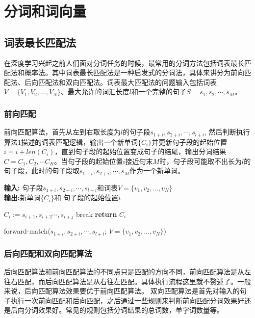 \documentclass[twoside,a4paper,12pt]{book}%
\begin{document}
\chapter{分词和词向量}

\section{词表最长匹配法}
在深度学习兴起之前人们面对分词任务的时候，最常用的分词方法包括词表最长匹配法和概率法。其中词表最长匹配法是一种启发式的分词法，具体来讲分为前向匹配法、后向匹配法和双向匹配法。词表最大匹配法的问题输入包括词表$V=\{V_1,V_2,\dots,V_N\}$、最大允许的词汇长度$l$和一个完整的句子$S=s_1,s_2,\cdots,s_M$。
\subsection{前向匹配}
前向匹配算法，首先从左到右取长度为$l$的句子段$s_{1+i},s_{2+i},\cdots,s_{l+i}$, 然后判断执行算法1描述的词表匹配逻辑，输出一个新单词$\{C_i\}$并更新句子段的起始位置$i=i + len(C_i)$，直到句子段的起始位置变成句子的结尾，输出分词结果$C=C_1,C_2, \cdots C_K$。当句子段的起始位置$i$接近句末$M$时，句子段可能取不出长为$l$的句子段，此时的句子段取$s_{1+i},s_{2+i},\cdots,s_{M}$作为一个新单词。
\begin{algorithm}[h]
    \textbf{输入:} 句子段$s_{1+i},s_{2+i},\cdots,s_{l+i}$和词表$V=\{v_1,v_2,\dots,v_N\}$\\
    \textbf{输出:}新单词$\{C_i\}$和 句子段的起始位置$i$
    \begin{algorithmic}[1]
     \label{algline:end} 
         \STATE $C_i:=s_{i+1},s_{i+2}\cdots,s_{i+j}$
         \STATE break \label{algline:break}
        \ENDIF  
    \ENDFOR \label{algline:endfor}
    \STATE \textbf{return} $C_i$ \label{algline:return}
    \end{algorithmic}
    \caption{forward-match($s_{1+i},s_{2+i},\cdots,s_{l+i}$; $V=\{v_1,v_2,\dots,v_N\}$)}
    \label{alg:alg1}
\end{algorithm}
\subsection{后向匹配和双向匹配算法}
后向匹配算法和前向匹配算法的不同点只是匹配的方向不同，前向匹配算法是从左往右匹配，而后向匹配算法是从右往左匹配。具体执行流程这里就不赘述了。一般来说，后向匹配算法效果要优于前向匹配算法。
双向匹配算法是首先对输入的句子执行一次前向匹配和后向匹配，之后通过一些规则来判断前向匹配分词效果好还是后向分词效果好。常见的规则包括分词结果的总词数，单字词数量等。
\end{document}
